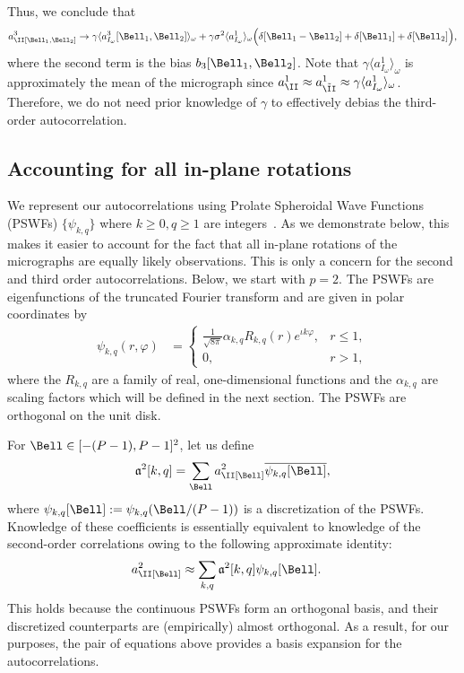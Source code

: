 \documentclass[9pt,twocolumn,twoside,lineno]{pnas-new}
\begin{document}
Thus, we conclude that
\begin{equation} \label{eq:third_order_ac_micro_volume}
a^3_\II[\Bell_1, \Bell_2] \to \gamma\langle
a^3_{I_{\omega}}[\Bell_1, \Bell_2]\rangle_{\omega} +
\gamma\sigma^2\langle a^1_{I_{\omega}}\rangle_{\omega}\Big(\delta[\Bell_1 - \Bell_2] +
\delta[\Bell_1] + \delta[\Bell_2]\Big),
\end{equation}
where the second term is the bias $b_3[\Bell_1,\Bell_2]$.
Note that $\gamma\langle a^1_{I_{\omega}}\rangle_{\omega}$ is approximately the mean of the micrograph since  $a^1_\II \approx a^1_{\tilde\II} \approx \gamma\langle a^1_{I_{\omega}}\rangle_{\omega}$. Therefore, we do not need prior knowledge of $\gamma$ to effectively
debias the third-order autocorrelation.


\subsection{Accounting for all in-plane rotations} \label{sec:steering}

We represent our autocorrelations using Prolate Spheroidal Wave Functions (PSWFs) $\{\psi_{k,q}\}$ where $k \geq 0, q \geq 1$ are integers~\cite{slepian1964pswfIV}. As we demonstrate below, this makes it easier to account for the fact that all in-plane rotations of the micrographs are equally likely observations. This is only a concern for the second and third order autocorrelations. Below, we start with $p=2$.
The PSWFs are eigenfunctions of the truncated Fourier transform and are given in polar coordinates by
\begin{align}
\psi_{k,q}(r,\varphi) & = \left\{\begin{array}{ll} \frac{1}{\sqrt{8\pi}}\alpha_{k,q}R_{k,q}(r)e^{\iota k\varphi}, & r\leq 1,\\ 0, & r>1,\end{array}\right. \label{eq:prolatesdef}
\end{align}
where the ${R_{k,q}}$ are a family of real, one-dimensional functions and the ${\alpha_{k,q}}$ are  scaling factors which will be defined in the next section.
The PSWFs are orthogonal on the unit disk.

For $\Bell \in [-(P-1), P-1]^2$, let us define 
\begin{equation} \label{eq:PSWF_expansion}
\mathfrak{a}^2[k, q]  =
\sum_{\Bell}a^2_\II[\Bell]\overline{\psi_{k,q}[\Bell]}, \end{equation}
where $\psi_{k,q}[\Bell] := \psi_{k,q}(\Bell/(P-1))$ is a discretization of the PSWFs. 
Knowledge of these coefficients is essentially equivalent to knowledge of the second-order correlations owing to the following approximate identity:
\begin{align}
a^2_\II[\Bell] & \approx \sum_{k,q}\mathfrak{a}^2[k,q]\psi_{k,q}[\Bell].
\label{eq:approxprolatesdiscrete}
\end{align}
This holds because the continuous PSWFs form an orthogonal basis, and their discretized counterparts are (empirically) almost orthogonal. As a result, for our purposes, the pair of equations above provides a basis expansion for the autocorrelations.
\end{document}
